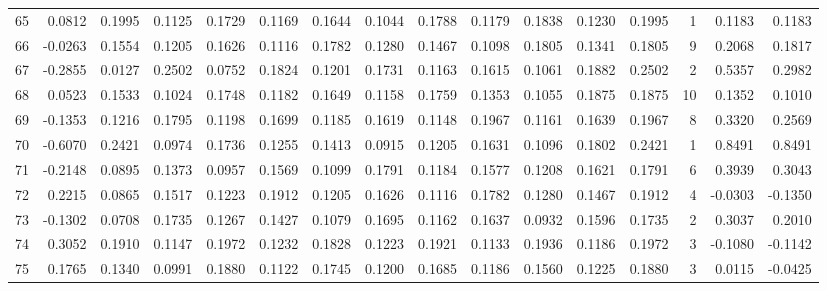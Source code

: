 \begin{tabular}{lrrrrrrrrrrrrrrr}
65  &      0.0812 &  0.1995 &  0.1125 &  0.1729 &  0.1169 &  0.1644 &  0.1044 &  0.1788 &  0.1179 &  0.1838 &   0.1230 &     0.1995 &      1 &                    0.1183 &                     0.1183 \\
66  &     -0.0263 &  0.1554 &  0.1205 &  0.1626 &  0.1116 &  0.1782 &  0.1280 &  0.1467 &  0.1098 &  0.1805 &   0.1341 &     0.1805 &      9 &                    0.2068 &                     0.1817 \\
67  &     -0.2855 &  0.0127 &  0.2502 &  0.0752 &  0.1824 &  0.1201 &  0.1731 &  0.1163 &  0.1615 &  0.1061 &   0.1882 &     0.2502 &      2 &                    0.5357 &                     0.2982 \\
68  &      0.0523 &  0.1533 &  0.1024 &  0.1748 &  0.1182 &  0.1649 &  0.1158 &  0.1759 &  0.1353 &  0.1055 &   0.1875 &     0.1875 &     10 &                    0.1352 &                     0.1010 \\
69  &     -0.1353 &  0.1216 &  0.1795 &  0.1198 &  0.1699 &  0.1185 &  0.1619 &  0.1148 &  0.1967 &  0.1161 &   0.1639 &     0.1967 &      8 &                    0.3320 &                     0.2569 \\
70  &     -0.6070 &  0.2421 &  0.0974 &  0.1736 &  0.1255 &  0.1413 &  0.0915 &  0.1205 &  0.1631 &  0.1096 &   0.1802 &     0.2421 &      1 &                    0.8491 &                     0.8491 \\
71  &     -0.2148 &  0.0895 &  0.1373 &  0.0957 &  0.1569 &  0.1099 &  0.1791 &  0.1184 &  0.1577 &  0.1208 &   0.1621 &     0.1791 &      6 &                    0.3939 &                     0.3043 \\
72  &      0.2215 &  0.0865 &  0.1517 &  0.1223 &  0.1912 &  0.1205 &  0.1626 &  0.1116 &  0.1782 &  0.1280 &   0.1467 &     0.1912 &      4 &                   -0.0303 &                    -0.1350 \\
73  &     -0.1302 &  0.0708 &  0.1735 &  0.1267 &  0.1427 &  0.1079 &  0.1695 &  0.1162 &  0.1637 &  0.0932 &   0.1596 &     0.1735 &      2 &                    0.3037 &                     0.2010 \\
74  &      0.3052 &  0.1910 &  0.1147 &  0.1972 &  0.1232 &  0.1828 &  0.1223 &  0.1921 &  0.1133 &  0.1936 &   0.1186 &     0.1972 &      3 &                   -0.1080 &                    -0.1142 \\
75  &      0.1765 &  0.1340 &  0.0991 &  0.1880 &  0.1122 &  0.1745 &  0.1200 &  0.1685 &  0.1186 &  0.1560 &   0.1225 &     0.1880 &      3 &                    0.0115 &                    -0.0425 \\

\end{tabular}
